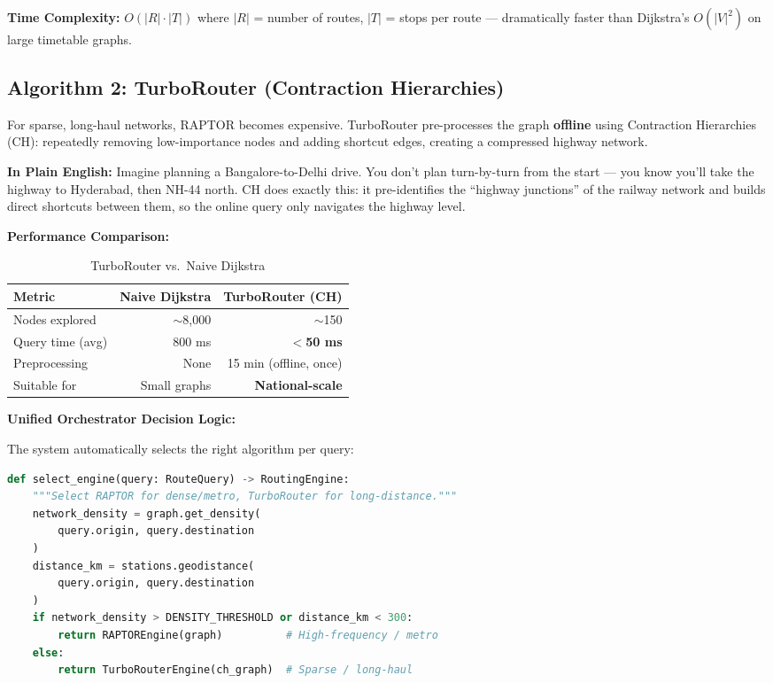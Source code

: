 \documentclass[12pt,a4paper]{report}
\begin{document}
\textbf{Time Complexity:} $O(|R| \cdot |T|)$ where $|R|$ = number of routes, $|T|$ = stops per route --- dramatically faster than Dijkstra's $O(|V|^2)$ on large timetable graphs.

\subsection{Algorithm 2: TurboRouter (Contraction Hierarchies)}

For sparse, long-haul networks, RAPTOR becomes expensive. TurboRouter pre-processes the graph \textbf{offline} using Contraction Hierarchies (CH): repeatedly removing low-importance nodes and adding shortcut edges, creating a compressed highway network.

\textbf{In Plain English:} Imagine planning a Bangalore-to-Delhi drive. You don't plan turn-by-turn from the start --- you know you'll take the highway to Hyderabad, then NH-44 north. CH does exactly this: it pre-identifies the ``highway junctions'' of the railway network and builds direct shortcuts between them, so the online query only navigates the highway level.

\textbf{Performance Comparison:}

\begin{table}[h!]
\centering
\caption{TurboRouter vs.\ Naive Dijkstra}
\begin{tabular}{lrr}
\toprule
\textbf{Metric} & \textbf{Naive Dijkstra} & \textbf{TurboRouter (CH)} \\
\midrule
Nodes explored & $\sim$8,000 & $\sim$150 \\
Query time (avg) & 800 ms & \textbf{$<$50 ms} \\
Preprocessing & None & 15 min (offline, once) \\
Suitable for & Small graphs & \textbf{National-scale} \\
\bottomrule
\end{tabular}
\end{table}

\textbf{Unified Orchestrator Decision Logic:}

The system automatically selects the right algorithm per query:

\begin{lstlisting}[language=Python, caption={Orchestrator Algorithm Selection Logic}]
def select_engine(query: RouteQuery) -> RoutingEngine:
    """Select RAPTOR for dense/metro, TurboRouter for long-distance."""
    network_density = graph.get_density(
        query.origin, query.destination
    )
    distance_km = stations.geodistance(
        query.origin, query.destination
    )
    if network_density > DENSITY_THRESHOLD or distance_km < 300:
        return RAPTOREngine(graph)          # High-frequency / metro
    else:
        return TurboRouterEngine(ch_graph)  # Sparse / long-haul
\end{lstlisting}
\end{document}
